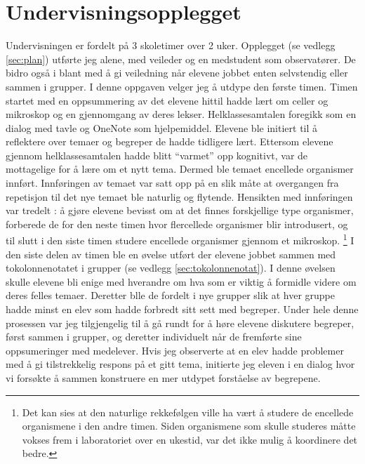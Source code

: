 \documentclass[main.tex]{subfiles}
\begin{document}
\section*{Undervisningsopplegget}
\label{sec:1}
Undervisningen er fordelt på 3 skoletimer over 2 uker. Opplegget (se vedlegg \ref{sec:plan}) 
utførte jeg alene, med veileder og en medstudent som observatører. De bidro også i blant 
med å gi veiledning når elevene jobbet enten selvstendig eller sammen i grupper. I denne 
oppgaven velger jeg å utdype den første timen. 
\newline
\newline
Timen startet med en oppsummering av det elevene hittil hadde lært om celler og mikroskop og en 
gjennomgang av deres lekser. Helklassesamtalen foregikk som en dialog med tavle og OneNote som hjelpemiddel. 
Elevene ble initiert til å reflektere over temaer og begreper de hadde tidligere lært. Ettersom elevene gjennom 
helklassesamtalen hadde blitt ``varmet'' opp kognitivt, var de mottagelige for å lære om et nytt tema. 
Dermed ble temaet encellede organismer innført. Innføringen av temaet var satt opp på en slik 
måte at overgangen fra repetisjon til det nye temaet ble naturlig og flytende. Hensikten med 
innføringen var tredelt : å gjøre elevene bevisst om at det finnes forskjellige type organismer, 
forberede de for den neste timen hvor flercellede organismer blir introdusert, og 
til slutt i den siste timen studere encellede organismer gjennom et mikroskop. \footnote[2]{Det kan sies 
at den naturlige rekkefølgen ville ha vært å studere de encellede organismene i den andre timen. 
Siden organismene som skulle studeres måtte vokses frem i laboratoriet over en ukestid, var det ikke 
mulig å koordinere det bedre.}
\newline
\newline
I den siste delen av timen ble en øvelse utført der elevene jobbet sammen med tokolonnenotatet i 
grupper (se vedlegg \ref{sec:tokolonnenotat}). I denne øvelsen skulle elevene bli enige med hverandre om hva som er 
viktig å formidle videre om deres felles temaer. Deretter blle de fordelt i nye grupper slik at hver 
gruppe hadde minst en elev som hadde forbredt sitt sett med begreper. Under hele denne prosessen var jeg 
tilgjengelig til å gå rundt for å høre elevene diskutere begreper, først sammen i grupper, og 
deretter individuelt når de fremførte sine oppsumeringer med medelever. Hvis jeg observerte at en 
elev hadde problemer med å gi tilstrekkelig respons på et gitt tema, initierte jeg eleven i en dialog 
hvor vi forsøkte å sammen konstruere en mer utdypet forståelse av begrepene.
\end{document}
